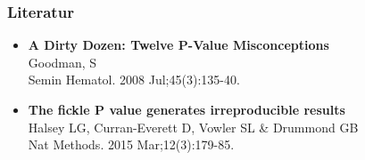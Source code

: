 \documentclass{beamer}
\begin{document}
\begin{frame}
	\frametitle{Literatur}
	\begin{itemize}
		\item \textbf{A Dirty Dozen: Twelve P-Value Misconceptions}\\
		Goodman, S\\
		Semin  Hematol . 2008 Jul;45(3):135-40.
		\vspace{1em}
			\item \textbf{The fickle P value generates irreproducible results}\\
			Halsey LG, Curran-Everett D, Vowler SL \& Drummond GB\\
			Nat Methods. 2015 Mar;12(3):179-85. 
	\end{itemize}
\end{frame}
\end{document}
